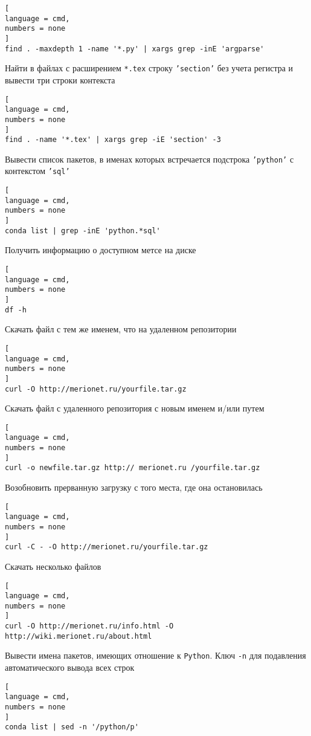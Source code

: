 \documentclass[%
	11pt,
	a4paper,
	utf8,
		]{article}
\begin{document}
\begin{lstlisting}[
language = cmd,
numbers = none
]
find . -maxdepth 1 -name '*.py' | xargs grep -inE 'argparse'
\end{lstlisting} 

Найти в файлах с расширением \texttt{*.tex} строку \texttt{'section'} без учета регистра и вывести три строки контекста
\begin{lstlisting}[
language = cmd,
numbers = none
]
find . -name '*.tex' | xargs grep -iE 'section' -3
\end{lstlisting}

Вывести список пакетов, в именах которых встречается подстрока \texttt{'python'} с контекстом \texttt{'sql'}
\begin{lstlisting}[
language = cmd,
numbers = none
]
conda list | grep -inE 'python.*sql'
\end{lstlisting}

Получить информацию о доступном метсе на диске
\begin{lstlisting}[
language = cmd,
numbers = none
]
df -h
\end{lstlisting}

Скачать файл с тем же именем, что на удаленном репозитории 
\begin{lstlisting}[
language = cmd,
numbers = none
]
curl -O http://merionet.ru/yourfile.tar.gz
\end{lstlisting}

Скачать файл с удаленного репозитория с новым именем и/или путем
\begin{lstlisting}[
language = cmd,
numbers = none
]
curl -o newfile.tar.gz http:// merionet.ru /yourfile.tar.gz
\end{lstlisting}

Возобновить прерванную загрузку с того места, где она остановилась
\begin{lstlisting}[
language = cmd,
numbers = none
]
curl -C - -O http://merionet.ru/yourfile.tar.gz
\end{lstlisting}

Скачать несколько файлов 
\begin{lstlisting}[
language = cmd,
numbers = none
]
curl -O http://merionet.ru/info.html -O http://wiki.merionet.ru/about.html
\end{lstlisting}

Вывести имена пакетов, имеющих отношение к \texttt{Python}. Ключ \verb|-n| для подавления автоматического вывода всех строк
\begin{lstlisting}[
language = cmd,
numbers = none
]
conda list | sed -n '/python/p' 
\end{lstlisting}
\end{document}
